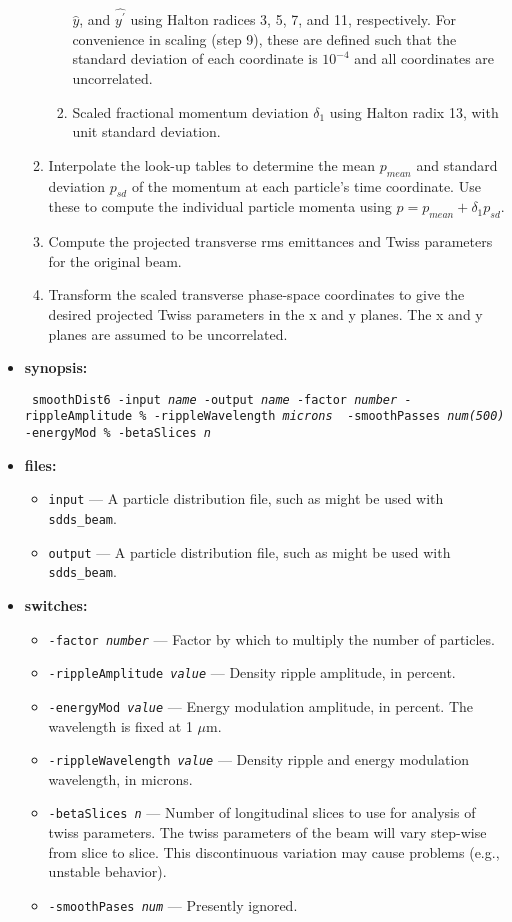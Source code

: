 \documentclass[11pt]{article}
\begin{document}
\begin{itemize}
\begin{enumerate}
\begin{enumerate}
 $\hat{y}$, and $\hat{y^\prime}$ using Halton radices 3, 5, 7, and 11,
 respectively.  For convenience in scaling (step 9), these are defined such that the standard deviation of
 each coordinate is $10^{-4}$ and all coordinates are uncorrelated.
 \item Scaled fractional momentum deviation $\delta_1$ using Halton radix 13, with
 unit standard deviation.
 \end{enumerate}
\item Interpolate the look-up tables to determine the mean $p_{mean}$ and standard 
 deviation $p_{sd}$ of the momentum at each particle's time coordinate. Use these
 to compute the individual particle momenta using $p = p_{mean} + \delta_1 p_{sd}$.
\item Compute the projected transverse rms emittances and Twiss parameters for the original beam.
\item Transform the scaled transverse phase-space coordinates to give the desired 
 projected Twiss parameters in the x and y planes.  The x and y planes are assumed to be uncorrelated.
\end{enumerate}

\item {\bf synopsis:}
\begin{flushleft}{\tt
smoothDist6 -input {\em name} -output {\em name} -factor {\em number} -rippleAmplitude {\em \%} -rippleWavelength {\em microns} \
 -smoothPasses {\em num(500)} -energyMod {\em \%} -betaSlices {\em n}
}\end{flushleft}

\item {\bf files:}
\begin{itemize}
\item {\tt input} --- A particle distribution file, such as might be used with \verb|sdds_beam|.
\item {\tt output} --- A particle distribution file, such as might be used with \verb|sdds_beam|.
\end{itemize}

\item {\bf switches:}
\begin{itemize}
\item {\tt -factor {\em number}} --- Factor by which to multiply the number of particles.
\item {\tt -rippleAmplitude {\em value}} --- Density ripple amplitude, in percent.
\item {\tt -energyMod {\em value}} --- Energy modulation amplitude, in percent.  The wavelength is fixed at 1 $\mu$m.
\item {\tt -rippleWavelength {\em value}} --- Density ripple and energy modulation wavelength, in microns.
\item {\tt -betaSlices {\em n}} --- Number of longitudinal slices to use for analysis of twiss parameters.  The twiss parameters of 
the beam will vary step-wise from slice to slice.  This discontinuous variation may cause problems (e.g., unstable behavior).
\item {\tt -smoothPases {\em num}} --- Presently ignored.
\end{itemize}


\end{itemize}
\end{document}

